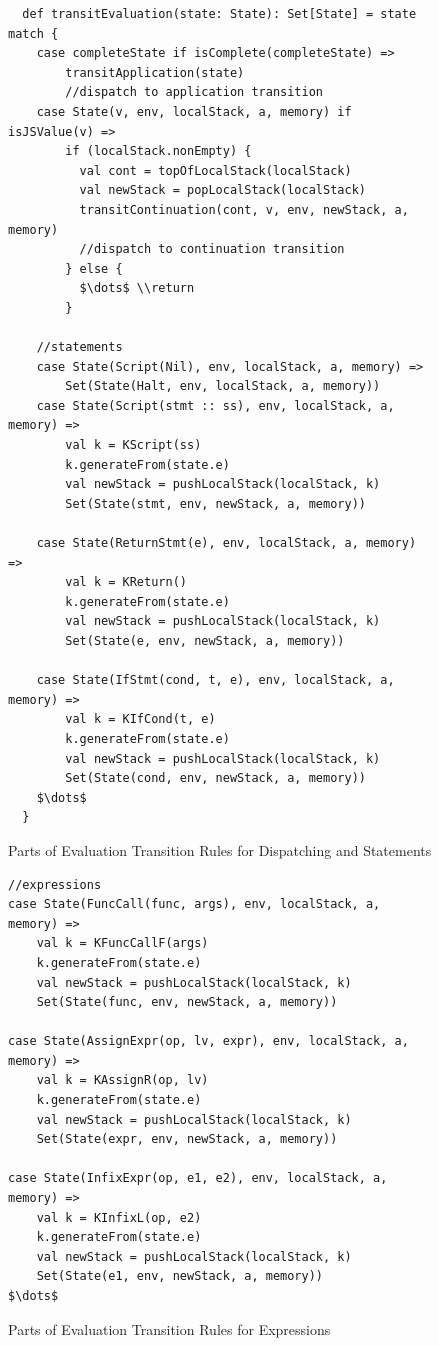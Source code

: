 \documentclass[12pt]{report}
\begin{document}
\begin{figure}
\lstset{language=Scala, mathescape}
\begin{lstlisting}
  def transitEvaluation(state: State): Set[State] = state match {
    case completeState if isComplete(completeState) =>
        transitApplication(state)
        //dispatch to application transition
    case State(v, env, localStack, a, memory) if isJSValue(v) =>
        if (localStack.nonEmpty) {
          val cont = topOfLocalStack(localStack)
          val newStack = popLocalStack(localStack)
          transitContinuation(cont, v, env, newStack, a, memory)
          //dispatch to continuation transition
        } else {
          $\dots$ \\return
        }

    //statements
    case State(Script(Nil), env, localStack, a, memory) =>
        Set(State(Halt, env, localStack, a, memory))
    case State(Script(stmt :: ss), env, localStack, a, memory) =>
        val k = KScript(ss)
        k.generateFrom(state.e)
        val newStack = pushLocalStack(localStack, k)
        Set(State(stmt, env, newStack, a, memory))

    case State(ReturnStmt(e), env, localStack, a, memory) =>
        val k = KReturn()
        k.generateFrom(state.e)
        val newStack = pushLocalStack(localStack, k)
        Set(State(e, env, newStack, a, memory))

    case State(IfStmt(cond, t, e), env, localStack, a, memory) =>
        val k = KIfCond(t, e)
        k.generateFrom(state.e)
        val newStack = pushLocalStack(localStack, k)
        Set(State(cond, env, newStack, a, memory))
    $\dots$
  }
\end{lstlisting}
\caption{Parts of Evaluation Transition Rules for Dispatching and Statements}
\label{fig:eval}
\end{figure}


\begin{figure}
\lstset{language=Scala, mathescape}
\begin{lstlisting}
//expressions
case State(FuncCall(func, args), env, localStack, a, memory) =>
    val k = KFuncCallF(args)
    k.generateFrom(state.e)
    val newStack = pushLocalStack(localStack, k)
    Set(State(func, env, newStack, a, memory))

case State(AssignExpr(op, lv, expr), env, localStack, a, memory) =>
    val k = KAssignR(op, lv)
    k.generateFrom(state.e)
    val newStack = pushLocalStack(localStack, k)
    Set(State(expr, env, newStack, a, memory))

case State(InfixExpr(op, e1, e2), env, localStack, a, memory) =>
    val k = KInfixL(op, e2)
    k.generateFrom(state.e)
    val newStack = pushLocalStack(localStack, k)
    Set(State(e1, env, newStack, a, memory))
$\dots$
\end{lstlisting}
\label{fig:eval}
\caption{Parts of Evaluation Transition Rules for Expressions}
\end{figure}
\end{document}
